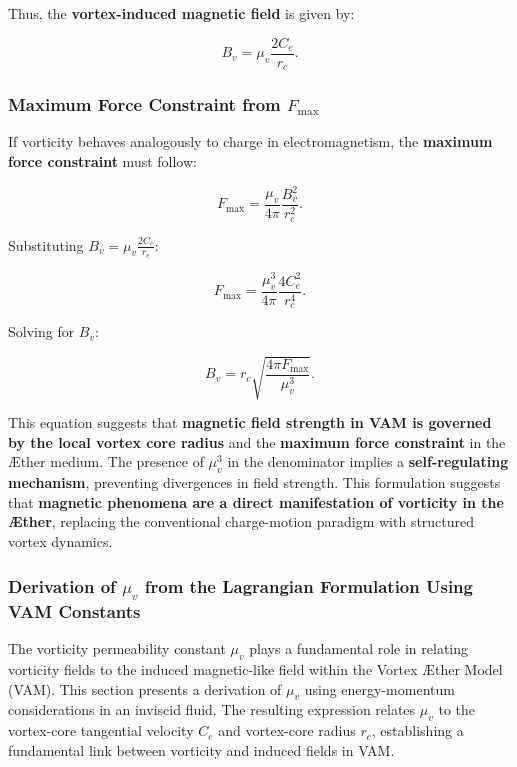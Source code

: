     Thus, the \textbf{vortex-induced magnetic field} is given by:

    \begin{equation*}
        B_v = \mu_v \frac{2 C_e}{r_c}.
    \end{equation*}

    \subsubsection*{Maximum Force Constraint from \( F_{\max} \)}
    If vorticity behaves analogously to charge in electromagnetism, the \textbf{maximum force constraint} must follow:

    \begin{equation*}
        F_{\max} = \frac{\mu_v}{4\pi} \frac{B_v^2}{r_c^2}.
    \end{equation*}

    Substituting \( B_v = \mu_v \frac{2 C_e}{r_c} \):

    \begin{equation*}
        F_{\max} = \frac{\mu_v^3}{4\pi} \frac{4 C_e^2}{r_c^4}.
    \end{equation*}

    Solving for \( B_v \):

    \begin{equation*}
        B_v = r_c \sqrt{\frac{4\pi F_{\max}}{\mu_v^3}}.
    \end{equation*}

    This equation suggests that \textbf{magnetic field strength in VAM is governed by the local vortex core radius} and the \textbf{maximum force constraint} in the Æther medium. The presence of \( \mu_v^3 \) in the denominator implies a \textbf{self-regulating mechanism}, preventing divergences in field strength.  This formulation suggests that \textbf{magnetic phenomena are a direct manifestation of vorticity in the Æther}, replacing the conventional charge-motion paradigm with structured vortex dynamics.

\subsubsection*{Derivation of \( \mu_v \) from the Lagrangian Formulation Using VAM Constants}
The vorticity permeability constant \( \mu_v \) plays a fundamental role in relating vorticity fields to the induced magnetic-like field within the Vortex Æther Model (VAM). This section presents a derivation of \( \mu_v \) using energy-momentum considerations in an inviscid fluid. The resulting expression relates \( \mu_v \) to the vortex-core tangential velocity \( C_e \) and vortex-core radius \( r_c \), establishing a fundamental link between vorticity and induced fields in VAM.

